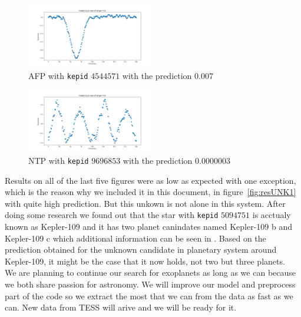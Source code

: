 \documentclass[twoside]{article}
\newcommand{\code}[1]{\texttt{#1}}
\begin{document}
\begin{multicols}{2}
\begin{figure}[H]
\includegraphics[width=0.5\textwidth]{resAFP}
\caption{AFP with \code{kepid} $4544571$ with the prediction $0.007$}
\label{fig:resAFP}
\end{figure}

\begin{figure}[H]
\includegraphics[width=0.5\textwidth]{resNTP}
\caption{NTP with \code{kepid} $9696853$ with the prediction $0.0000003$}
\label{fig:resAFP}
\end{figure}

Results on all of the last five figures were as low as expected with one exception, which is the reason why we included it in this document, in figure~\ref{fig:resUNK1} with quite high prediction. But this unkown is not alone in this system. After doing some research we found out that the star with \code{kepid} $5094751$ is acctualy known as Kepler-109 and it has two planet canindates named Kepler-109 b and Kepler-109 c which additional information can be seen in \cite{oExoCat}. Based on the prediction obtained for the unknown candidate in planetary system around Kepler-109, it might be the case that it now holds, not two but three planets. 
\\
We are planning to continue our search for exoplanets as long as we can because we both share passion for astronomy. We will improve our model and preprocess part of the code so we extract the most that we can from the data as fast as we can. New data from TESS will arive and we will be ready for it. 

\begin{thebibliography}{99}


\end{thebibliography}
\end{multicols}
\end{document}
